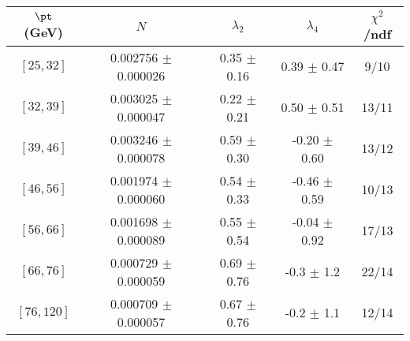 \begin{tabular}{c||c|c|c|c}
$\pt$ (GeV) & $N$ & $\lambda_{2}$ & $\lambda_4$  & $\chi^2$/ndf  \\
\hline
$[25, 32]$ & 0.002756 $\pm$ 0.000026 & 0.35 $\pm$ 0.16 & 0.39 $\pm$ 0.47 & 9/10\\
$[32, 39]$ & 0.003025 $\pm$ 0.000047 & 0.22 $\pm$ 0.21 & 0.50 $\pm$ 0.51 & 13/11\\
$[39, 46]$ & 0.003246 $\pm$ 0.000078 & 0.59 $\pm$ 0.30 & -0.20 $\pm$ 0.60 & 13/12\\
$[46, 56]$ & 0.001974 $\pm$ 0.000060 & 0.54 $\pm$ 0.33 & -0.46 $\pm$ 0.59 & 10/13\\
$[56, 66]$ & 0.001698 $\pm$ 0.000089 & 0.55 $\pm$ 0.54 & -0.04 $\pm$ 0.92 & 17/13\\
$[66, 76]$ & 0.000729 $\pm$ 0.000059 & 0.69 $\pm$ 0.76 & -0.3 $\pm$ 1.2 & 22/14\\
$[76, 120]$ & 0.000709 $\pm$ 0.000057 & 0.67 $\pm$ 0.76 & -0.2 $\pm$ 1.1 & 12/14\\
\end{tabular}
